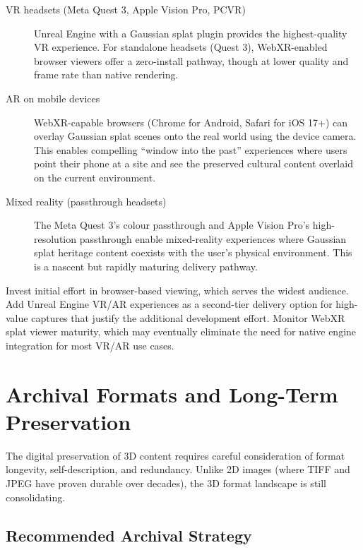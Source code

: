 \begin{description}
  \item[VR headsets (Meta Quest 3, Apple Vision Pro, PCVR)] Unreal Engine with a Gaussian splat plugin provides the highest-quality VR experience. For standalone headsets (Quest 3), WebXR-enabled browser viewers offer a zero-install pathway, though at lower quality and frame rate than native rendering.

  \item[AR on mobile devices] WebXR-capable browsers (Chrome for Android, Safari for iOS 17+) can overlay Gaussian splat scenes onto the real world using the device camera. This enables compelling ``window into the past'' experiences where users point their phone at a site and see the preserved cultural content overlaid on the current environment.

  \item[Mixed reality (passthrough headsets)] The Meta Quest 3's colour passthrough and Apple Vision Pro's high-resolution passthrough enable mixed-reality experiences where Gaussian splat heritage content coexists with the user's physical environment. This is a nascent but rapidly maturing delivery pathway.
\end{description}

\begin{recommendation}
Invest initial effort in browser-based viewing, which serves the widest audience. Add Unreal Engine VR/AR experiences as a second-tier delivery option for high-value captures that justify the additional development effort. Monitor WebXR splat viewer maturity, which may eventually eliminate the need for native engine integration for most VR/AR use cases.
\end{recommendation}

\section{Archival Formats and Long-Term Preservation}
\label{sec:view-archival}

The digital preservation of 3D content requires careful consideration of format longevity, self-description, and redundancy. Unlike 2D images (where TIFF and JPEG have proven durable over decades), the 3D format landscape is still consolidating.

\subsection{Recommended Archival Strategy}

